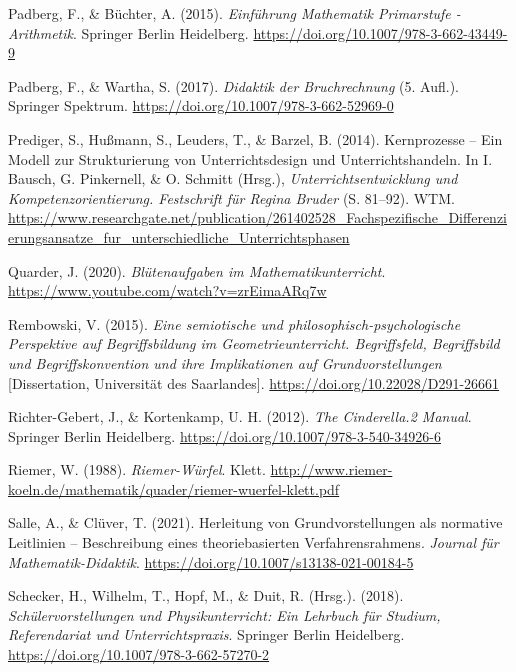 \documentclass[
  ngerman,
]{scrbook}
\newlength{\cslhangindent}
\newlength{\cslentryspacingunit} %
\newenvironment{CSLReferences}[2] %
 {%
  \setlength{\parindent}{0pt}
  \ifodd #1
  \let\oldpar\par
  \def\par{\hangindent=\cslhangindent\oldpar}
  \fi
  \setlength{\parskip}{#2\cslentryspacingunit}
 }%
 {}
\theoremstyle{definition}
\theoremstyle{definition}
\theoremstyle{definition}
\theoremstyle{definition}
\theoremstyle{remark}
\begin{document}
\begin{CSLReferences}{1}{0}
\leavevmode{}%
Padberg, F., \& Büchter, A. (2015). \emph{Einführung {Mathematik} {Primarstufe} - {Arithmetik}}. Springer Berlin Heidelberg. \url{https://doi.org/10.1007/978-3-662-43449-9}

\leavevmode{}%
Padberg, F., \& Wartha, S. (2017). \emph{Didaktik der {Bruchrechnung}} (5. Aufl.). Springer Spektrum. \url{https://doi.org/10.1007/978-3-662-52969-0}

\leavevmode{}%
Prediger, S., Hußmann, S., Leuders, T., \& Barzel, B. (2014). Kernprozesse -- {Ein} {Modell} zur {Strukturierung} von {Unterrichtsdesign} und {Unterrichtshandeln}. In I. Bausch, G. Pinkernell, \& O. Schmitt (Hrsg.), \emph{Unterrichtsentwicklung und {Kompetenzorientierung}. {Festschrift} für {Regina} {Bruder}} (S. 81--92). WTM. \url{https://www.researchgate.net/publication/261402528_Fachspezifische_Differenzierungsansatze_fur_unterschiedliche_Unterrichtsphasen}

\leavevmode{}%
Quarder, J. (2020). \emph{Blütenaufgaben im {Mathematikunterricht}}. \url{https://www.youtube.com/watch?v=zrEimaARq7w}

\leavevmode{}%
Rembowski, V. (2015). \emph{Eine semiotische und philosophisch-psychologische {Perspektive} auf {Begriffsbildung} im {Geometrieunterricht}. {Begriffsfeld}, {Begriffsbild} und {Begriffskonvention} und ihre {Implikationen} auf {Grundvorstellungen}} {[}Dissertation, Universität des Saarlandes{]}. \url{https://doi.org/10.22028/D291-26661}

\leavevmode{}%
Richter-Gebert, J., \& Kortenkamp, U. H. (2012). \emph{The {Cinderella}.2 {Manual}}. Springer Berlin Heidelberg. \url{https://doi.org/10.1007/978-3-540-34926-6}

\leavevmode{}%
Riemer, W. (1988). \emph{Riemer-{Würfel}}. Klett. \url{http://www.riemer-koeln.de/mathematik/quader/riemer-wuerfel-klett.pdf}

\leavevmode{}%
Salle, A., \& Clüver, T. (2021). Herleitung von {Grundvorstellungen} als normative {Leitlinien} -- {Beschreibung} eines theoriebasierten {Verfahrensrahmens}. \emph{Journal für Mathematik-Didaktik}. \url{https://doi.org/10.1007/s13138-021-00184-5}

\leavevmode{}%
Schecker, H., Wilhelm, T., Hopf, M., \& Duit, R. (Hrsg.). (2018). \emph{Schülervorstellungen und {Physikunterricht}: {Ein} {Lehrbuch} für {Studium}, {Referendariat} und {Unterrichtspraxis}}. Springer Berlin Heidelberg. \url{https://doi.org/10.1007/978-3-662-57270-2}


\end{CSLReferences}
\end{document}
